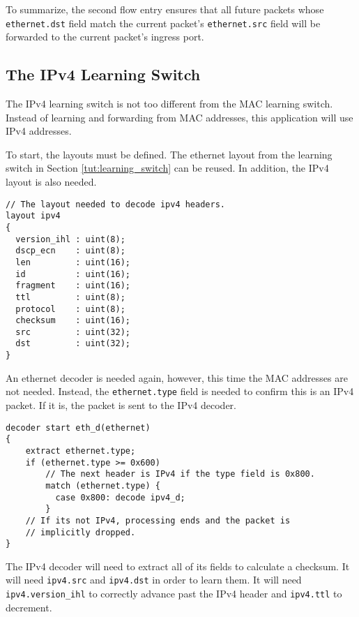 To summarize, the second flow entry ensures that all future packets whose
\texttt{ethernet.dst} field match the current packet's \texttt{ethernet.src}
field will be forwarded to the current packet's ingress port.

\subsection{The IPv4 Learning Switch} \label{tut:learning_router}

The IPv4 learning switch is not too different from the MAC learning switch. Instead of
learning and forwarding from MAC addresses, this application will use IPv4
addresses.

To start, the layouts must be defined. The ethernet layout
from the learning switch in Section \ref{tut:learning_switch} can be reused. 
In addition, the IPv4 layout is also needed.

\begin{codepage}
\begin{lstlisting}
// The layout needed to decode ipv4 headers.
layout ipv4
{
  version_ihl : uint(8);
  dscp_ecn    : uint(8);
  len         : uint(16);
  id          : uint(16);
  fragment    : uint(16);
  ttl         : uint(8);
  protocol    : uint(8);
  checksum    : uint(16);
  src         : uint(32);
  dst         : uint(32);
}
\end{lstlisting}
\end{codepage}

An ethernet decoder is needed again, however, this time the MAC
addresses are not needed. Instead, the \texttt{ethernet.type} field is needed to confirm
this is an IPv4 packet. If it is, the packet is sent to the IPv4 decoder.

\begin{codepage}
\begin{lstlisting}
decoder start eth_d(ethernet)
{
	extract ethernet.type;
	if (ethernet.type >= 0x600)
	  	// The next header is IPv4 if the type field is 0x800.
	    match (ethernet.type) {
	      case 0x800: decode ipv4_d;
	    }
	// If its not IPv4, processing ends and the packet is
	// implicitly dropped.
}
\end{lstlisting}
\end{codepage}

The IPv4 decoder will need to extract all of its fields to calculate a checksum. It will need \texttt{ipv4.src} and \texttt{ipv4.dst} in
order to learn them. It will need \texttt{ipv4.version\_ihl} to
correctly advance past the IPv4 header and \texttt{ipv4.ttl} to decrement.

